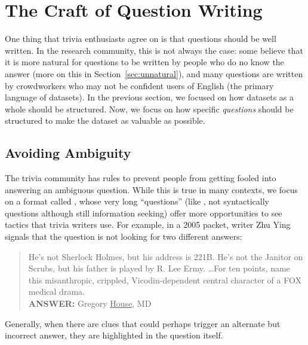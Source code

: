 \section{The Craft of Question Writing}
\label{sec:craft}

One thing that trivia enthusiasts agree on is that questions should be well written.
In the research community, this is not always the case: some believe that it is more natural for questions to be written by people who do no know the answer (more on this in Section~\ref{sec:unnatural}), and many questions are written by crowdworkers who may not be confident users of English (the primary language of  datasets).
In the previous section, we focused on how datasets as a whole should be structured.
Now, we focus on how specific \emph{questions} should be structured to make the dataset as valuable as possible.

\subsection{Avoiding Ambiguity}
\label{sec:ambiguity}

The trivia community has rules to prevent people from getting fooled
into answering an ambiguous question.
While this is true in many contexts, we focus on a format called \qb{}, whose very long ``questions'' (like \jeopardy{}, not syntactically questions although still information seeking) offer more opportunities to see tactics that trivia writers use.
For example, in a 2005  packet, writer Zhu Ying signals that the question is not looking for two different answers:
\begin{quote}
 He's not Sherlock Holmes, but his address is 221B. He's not the Janitor on Scrubs, but his father is played by R. Lee Ermy. \dots For ten points, name this misanthropic, crippled, Vicodin-dependent central character of a FOX medical drama. \\
{\bf ANSWER:} Gregory \underline{House}, MD
\end{quote}
Generally, when there are clues that could perhaps trigger an alternate but incorrect answer, they are highlighted in the question itself.


